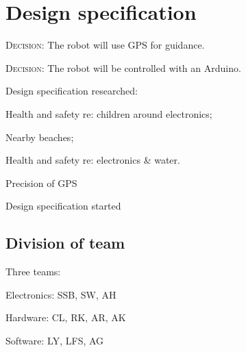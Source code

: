 \documentclass[a4paper,11pt,twoside,class=meetingmins,crop=false]{standalone}
\begin{document}
\section{Design specification}
\begin{items}
    \item \textsc{Decision}: The robot will use GPS for guidance.
    \item \textsc{Decision}: The robot will be controlled with an Arduino.
    \item Design specification researched:
    \begin{subitems}
        \item {} Health and safety re: children around electronics;
        \item {} Nearby beaches;
        \item {} Health and safety re: electronics \& water.
        \item {} Precision of GPS
    \end{subitems}
    \item Design specification started
\subsection{Division of team}
    \item Three teams:
    \begin{subitems}
        \item Electronics: SSB, SW, AH
        \item Hardware: CL, RK, AR, AK
        \item Software: LY, LFS, AG
    \end{subitems}

\end{items}
\end{document}
